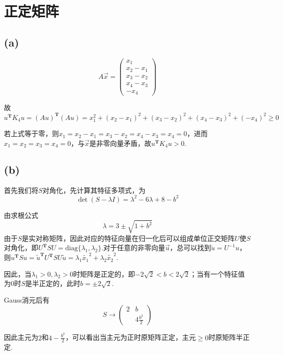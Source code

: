 \documentclass[UTF8]{ctexart}
\begin{document}
\section{正定矩阵}
\subsection*{(a)}
\begin{equation*}
    A\vec{x}=\begin{pmatrix}
        x_1\\x_2-x_1\\x_3-x_2\\x_4-x_3\\-x_4
    \end{pmatrix}
\end{equation*}

故$u^\mathbf{T}K_4u=(Au)^\mathbf{T}(Au)=x_1^2+(x_2-x_1)^2+(x_3-x_2)^2+(x_4-x_3)^2+(-x_4)^2\geq0$

若上式等于零，则$x_1=x_2-x_1=x_3-x_2=x_4-x_3=x_4=0$，进而$x_1=x_2=x_3=x_4=0$，与$\vec{x}$是非零向量矛盾，故$u^\mathbf{T}K_4u>0$.
\subsection*{(b)}
首先我们将$S$对角化，先计算其特征多项式，为\begin{equation*}
    \det(S-\lambda I)=\lambda^2-6\lambda+8-b^2
\end{equation*}

由求根公式\begin{equation*}
    \lambda=3\pm\sqrt{1+b^2}
\end{equation*}
由于$S$是实对称矩阵，因此对应的特征向量在归一化后可以组成单位正交矩阵$U$使$S$对角化，即$U^\mathbf{T}SU=\text{diag}\{\lambda_1,\lambda_2\}$.对于任意的非零向量$\vec{u}$，总可以找到$\tilde{u}=U^{-1}u$，则$u^\mathbf{T}Su=\tilde{u}^\mathbf{T}U^\mathbf{T}SU\tilde{u}=\lambda_1\tilde{x_1}^2+\lambda_2\tilde{x_2}^2$.

因此，当$\lambda_1>0,\lambda_2>0$时矩阵是正定的，即$-2\sqrt{2}<b<2\sqrt{2}$；当有一个特征值为$0$时$S$是半正定的，此时$b=\pm 2\sqrt{2}$. 

Gauss消元后有\begin{equation*}
    S\to\begin{pmatrix}
        2&b\\
        &4\frac{b^2}{2}
    \end{pmatrix} 
\end{equation*}

因此主元为$2$和$4-\frac{b^2}{2}$，可以看出当主元为正时原矩阵正定，主元$\ge0$时原矩阵半正定.
\nocite{*}


\end{document}
